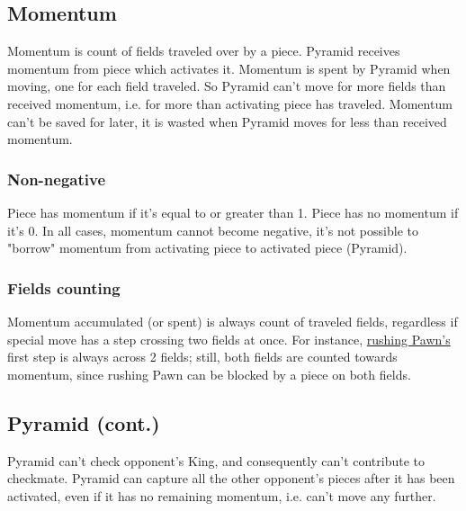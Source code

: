 \subsection*{Momentum}
\label{sec:Mayan Ascendancy/Pyramid/Momentum}

Momentum is count of fields traveled over by a piece. Pyramid receives
momentum from piece which activates it. Momentum is spent by Pyramid when
moving, one for each field traveled. So Pyramid can't move for more
fields than received momentum, i.e. for more than activating piece has
traveled. Momentum can't be saved for later, it is wasted when Pyramid
moves for less than received momentum.

\subsubsection*{Non-negative}
\label{sec:Mayan Ascendancy/Pyramid/Momentum/Non-negative}

Piece has momentum if it's equal to or greater than 1. Piece has no momentum
if it's 0. In all cases, momentum cannot become negative, it's not possible
to "borrow" momentum from activating piece to activated piece (Pyramid).


\subsubsection*{Fields counting}
\label{sec:Mayan Ascendancy/Pyramid/Momentum/Fields counting}

Momentum accumulated (or spent) is always count of traveled fields, regardless
if special move has a step crossing two fields at once. For instance,
\hyperref[fig:04_croatian_ties_en_passant]{rushing Pawn's} first step is always
across 2 fields; still, both fields are counted towards momentum, since rushing
Pawn can be blocked by a piece on both fields.

\subsection*{Pyramid (cont.)}
\label{sec:Mayan Ascendancy/Pyramid/Pyramid (cont.)}

Pyramid can't check opponent's King, and consequently can't contribute to
checkmate. Pyramid can capture all the other opponent's pieces after it has
been activated, even if it has no remaining momentum, i.e. can't move any
further.

